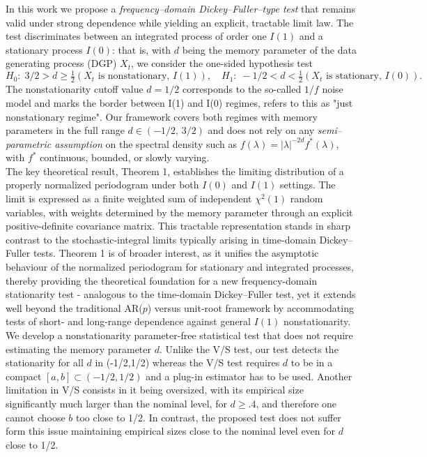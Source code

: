 \documentclass[12pt]{article}
\begin{document}
\medskip
In this work we propose a \emph{frequency--domain Dickey--Fuller--type test} that remains valid under strong dependence while yielding an explicit, tractable limit law. The test discriminates between an integrated process of order one $I(1)$ and a stationary process $I(0)$: that is, with $d$ being the memory parameter of the data generating process (DGP) $X_t$,  we consider the one-sided hypothesis test
\[
H_0:\; 3/2>d \ge \tfrac12  (X_t\text{ is nonstationary, }I(1)), 
\quad  
H_1:\; -1/2<d < \tfrac12  (X_t\text{ is stationary, }I(0)).
\]
The nonstationarity cutoff value $d=1/2$ corresponds to the so-called $1/f$ noise model and marks the border between I(1) and I(0) regimes, \cite{Robinson} refers to this as "just nonstationary regime".
Our framework covers both regimes with memory parameters in the full range $d\in(-1/2,\,3/2)$ and does not rely on any \emph{semi--parametric assumption} on the spectral density such as $f(\lambda)=|\lambda|^{-2d}f^*(\lambda)$, with $f^*$  continuous, bounded, or slowly varying. \\
The key theoretical result, Theorem 1, establishes the limiting distribution of a properly normalized periodogram under both $I(0)$ and $I(1)$ settings. The limit is expressed as a finite weighted sum of independent $\chi^2(1)$ random variables, with weights determined by the memory parameter through an explicit positive-definite covariance matrix. This tractable representation stands in sharp contrast to the stochastic-integral limits typically arising in time-domain Dickey–Fuller tests. Theorem 1 is of broader interest, as it unifies the asymptotic behaviour of the normalized periodogram for stationary and integrated processes, thereby providing the theoretical foundation for a new frequency-domain stationarity test - analogous to the time-domain Dickey–Fuller test, yet it extends well beyond the traditional AR($p$) versus unit-root framework by accommodating  tests of short- and long-range dependence against general $I(1)$ nonstationarity.\\
We develop a nonstationarity parameter-free statistical test that does not require estimating the memory parameter $d$. Unlike the  V/S test, our test detects the stationarity for all $d$ in (-1/2,1/2) whereas the  V/S test requires $d$ to be in a compact $[a,b]\subset(-1/2,1/2)$ and a plug-in estimator has to be used. Another limitation in V/S consists in it  being oversized, with its empirical size significantly much larger than the nominal level, for $d\ge.4$, and therefore one cannot choose $b$ too close to 1/2. In contrast, the proposed test does not suffer form  this issue maintaining  empirical sizes close to the nominal level even for $d$  close to 1/2. \\\\
\end{document}
